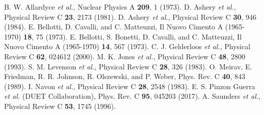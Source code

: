 \documentclass[12pt]{article}
\begin{document}
\begin{thebibliography}{12}

B. W. Allardyce \textit{et al.}, Nuclear Physics A \textbf{209}, 1 (1973).
D. Ashery \textit{et al.}, Physical Review C \textbf{23}, 2173 (1981).
D. Ashery \textit{et al.}, Physical Review C \textbf{30}, 946 (1984).
E. Bellotti, D. Cavalli, and C. Matteuzzi, Il Nuovo Cimento A (1965-1970) \textbf{18}, 75 (1973).
E. Bellotti, S. Bonetti, D. Cavalli, and C. Matteuzzi, Il
Nuovo Cimento A (1965-1970) \textbf{14}, 567 (1973).
C. J. Gelderloos \textit{et al.}, Physical Review C \textbf{62}, 024612
(2000).
M. K. Jones \textit{et al.}, Physical Review C \textbf{48}, 2800 (1993).
S. M. Levenson \textit{et al.}, Physical Review C \textbf{28}, 326 (1983).
O. Meirav, E. Friedman, R. R. Johnson, R. Olszewski,
and P. Weber, Phys. Rev. C \textbf{40}, 843 (1989).
I. Navon \textit{et al.}, Physical Review C \textbf{28}, 2548 (1983).
E. S. Pinzon Guerra \textit{et al.} (DUET Collaboration), Phys.
Rev. C \textbf{95}, 045203 (2017).
A. Saunders \textit{et al.}, Physical Review C \textbf{53}, 1745 (1996).
\end{thebibliography}
\end{document}
